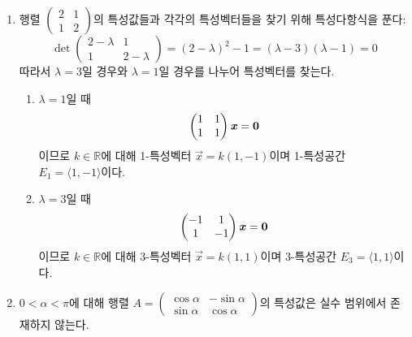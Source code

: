 \documentclass[sections/engineering_mathematics_lecture_note.tex]{subfiles}
\begin{document}
\begin{example}
    \leavevmode
    \begin{enumerate}
        \item 행렬 $\begin{pmatrix}2 & 1\\1 & 2\end{pmatrix}$의 특성값들과 각각의 특성벡터들을 찾기 위해 특성다항식을 푼다:
            \begin{equation*}
                \det
                \begin{pmatrix}
                    2 - \lambda & 1\\
                    1 & 2 - \lambda
                \end{pmatrix}
                = (2 - \lambda)^2 - 1 = (\lambda - 3)(\lambda - 1) = 0
            \end{equation*}
            따라서 $\lambda = 3$일 경우와 $\lambda = 1$일 경우를 나누어 특성벡터를 찾는다.
            \begin{enumerate}
                \item $\lambda = 1$일 때
                    \begin{equation*}
                        \begin{pmatrix}
                            1 & 1\\
                            1 & 1
                        \end{pmatrix}
                        \bm{\mathit{x}} = \bm{\mathrm{0}}
                    \end{equation*}
                    이므로 $k \in \mathbb R$에 대해 1-특성벡터 $\vec x = k(1, -1)$이며 1-특성공간 $E_1 = \langle 1, -1 \rangle$이다.
                \item $\lambda = 3$일 때
                    \begin{equation*}
                        \begin{pmatrix}
                            -1 & 1\\
                            1 & -1
                        \end{pmatrix}
                        \bm{\mathit{x}} = \bm{\mathrm{0}}
                    \end{equation*}
                    이므로 $k \in \mathbb R$에 대해 3-특성벡터 $\vec x = k(1, 1)$이며 3-특성공간 $E_3 = \langle 1, 1 \rangle$이다.
            \end{enumerate}
        \item $0 < \alpha < \pi$에 대해 행렬 $A = \begin{pmatrix}\cos \alpha & -\sin \alpha\\\sin \alpha & \cos \alpha\end{pmatrix}$의 특성값은 실수 범위에서 존재하지 않는다.

\end{enumerate}
\end{example}
\end{document}
